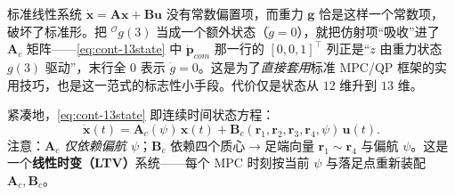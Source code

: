 \begin{insight}\label{ins:gravity-aug}
标准线性系统 $\dot{\boldsymbol{x}}=\mathbf{A}\boldsymbol{x}+\mathbf{B}\boldsymbol{u}$ 没有常数偏置项，而重力 $\boldsymbol{g}$ 恰是这样一个常数项，破坏了标准形。把 ${}^{\mathcal{O}}g(3)$ 当成一个额外状态（$\dot g=0$），就把仿射项“吸收”进了 $\mathbf{A}_c$ 矩阵——\cref{eq:cont-13state} 中 $\dot{\boldsymbol{p}}_{com}$ 那一行的 $[0,0,1]^\top$ 列正是“$\ddot z$ 由重力状态 $g(3)$ 驱动”，末行全 $0$ 表示 $\dot g=0$。这是为了\emph{直接套用}标准 MPC/QP 框架的实用技巧，也是这一范式的标志性小手段。代价仅是状态从 $12$ 维升到 $13$ 维。
\end{insight}

紧凑地，\cref{eq:cont-13state} 即连续时间状态方程\cite{yu2021quadruped}：
\begin{equation}
  \dot{\boldsymbol{x}}(t)=\mathbf{A}_c(\psi)\,\boldsymbol{x}(t)+\mathbf{B}_c(\boldsymbol{r}_1,\boldsymbol{r}_2,\boldsymbol{r}_3,\boldsymbol{r}_4,\psi)\,\boldsymbol{u}(t).
  \label{eq:cont-compact}
\end{equation}
注意：$\mathbf{A}_c$ \emph{仅依赖偏航 $\psi$}；$\mathbf{B}_c$ 依赖四个质心$\to$足端向量 $\boldsymbol{r}_1\!\sim\!\boldsymbol{r}_4$ 与偏航 $\psi$。这是一个\textbf{线性时变（LTV）}系统——每个 MPC 时刻按当前 $\psi$ 与落足点重新装配 $\mathbf{A}_c,\mathbf{B}_c$。

